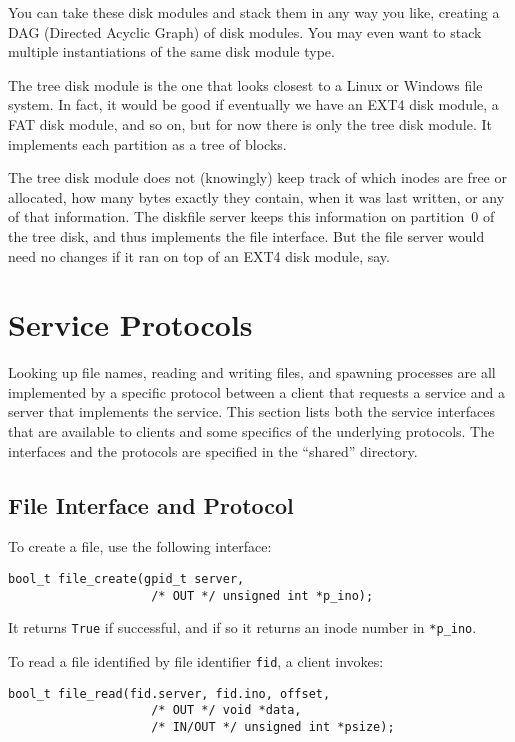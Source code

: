 \documentclass{article}
\begin{document}
You can take these disk modules and stack them in any way you like,
creating a DAG (Directed Acyclic Graph) of disk modules.  You may
even want to stack multiple instantiations of the same disk module type.

The tree disk module is the one that looks closest to a Linux or
Windows file system.  In fact, it would be good if eventually we have
an EXT4 disk module, a FAT disk module, and so on, but for now there
is only the tree disk module.  It implements each partition as a tree of
blocks.

The tree disk module does not (knowingly) keep track of which inodes are
free or allocated, how many bytes exactly they contain, when it was last
written, or any of that information.  The diskfile server keeps this
information on partition~0 of the tree disk, and thus implements the file
interface.  But the file server would need no changes if it ran on top
of an EXT4 disk module, say.

\section{Service Protocols}

Looking up file names, reading and writing files, and spawning processes
are all implemented by a specific protocol between a client that
requests a service and a server that implements the service.
This section lists both the service interfaces that are available to
clients and some specifics of the underlying protocols.
The interfaces and the protocols are specified in the ``shared'' directory.

\subsection{File Interface and Protocol}

To create a file, use the following interface:

\begin{verbatim}
bool_t file_create(gpid_t server,
                    /* OUT */ unsigned int *p_ino);
\end{verbatim}

It returns \texttt{True} if successful, and if so it returns an inode number in \texttt{*p\_ino}.

To read a file identified by file identifier \texttt{fid}, a client invokes:

\begin{verbatim}
bool_t file_read(fid.server, fid.ino, offset,
                    /* OUT */ void *data,
                    /* IN/OUT */ unsigned int *psize);
\end{verbatim}
\end{document}
